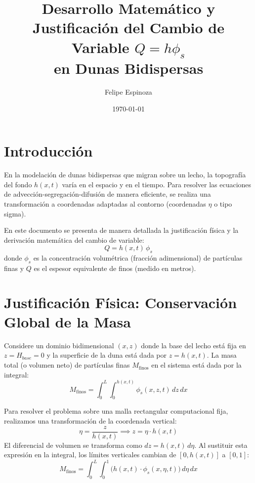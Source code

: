 \documentclass[11pt,a4paper]{article}
\title{\textbf{Desarrollo Matemático y Justificación del Cambio de Variable $Q = h \phi_s$\\ en Dunas Bidispersas}}
\author{Felipe Espinoza}
\date{\today}
\begin{document}
\maketitle

\section{Introducción}
En la modelación de dunas bidispersas que migran sobre un lecho, la topografía del fondo $h(x,t)$ varía en el espacio y en el tiempo. Para resolver las ecuaciones de advección-segregación-difusión de manera eficiente, se realiza una transformación a coordenadas adaptadas al contorno (coordenadas $\eta$ o tipo sigma). 

En este documento se presenta de manera detallada la justificación física y la derivación matemática del cambio de variable:
\begin{equation}
    Q = h(x,t) \, \phi_s
\end{equation}
donde $\phi_s$ es la concentración volumétrica (fracción adimensional) de partículas finas y $Q$ es el espesor equivalente de finos (medido en metros).

\section{Justificación Física: Conservación Global de la Masa}
Considere un dominio bidimensional $(x,z)$ donde la base del lecho está fija en $z = H_{base} = 0$ y la superficie de la duna está dada por $z = h(x,t)$. La masa total (o volumen neto) de partículas finas $M_{\text{finos}}$ en el sistema está dada por la integral:
\begin{equation}
    M_{\text{finos}} = \int_{0}^{L} \int_{0}^{h(x,t)} \phi_s(x, z, t) \, dz \, dx
\end{equation}

Para resolver el problema sobre una malla rectangular computacional fija, realizamos una transformación de la coordenada vertical:
\begin{equation}
    \eta = \frac{z}{h(x,t)} \implies z = \eta \cdot h(x,t)
\end{equation}
El diferencial de volumen se transforma como $dz = h(x,t) \, d\eta$. Al sustituir esta expresión en la integral, los límites verticales cambian de $[0, h(x,t)]$ a $[0, 1]$:
\begin{equation}
    M_{\text{finos}} = \int_{0}^{L} \int_{0}^{1} \Big( h(x,t) \cdot \phi_s(x, \eta, t) \Big) \, d\eta \, dx
\end{equation}
\end{document}
